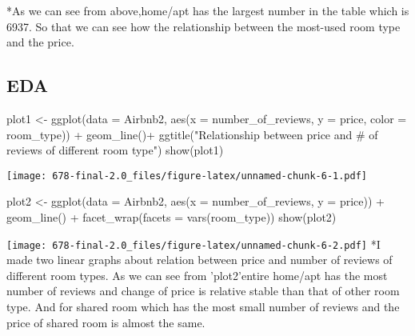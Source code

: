 \documentclass[
]{article}
\newenvironment{Shaded}{\begin{snugshade}}{\end{snugshade}}
\newcommand{\AttributeTok}[1]{\textcolor[rgb]{0.77,0.63,0.00}{#1}}
\newcommand{\FunctionTok}[1]{\textcolor[rgb]{0.00,0.00,0.00}{#1}}
\newcommand{\NormalTok}[1]{#1}
\newcommand{\OtherTok}[1]{\textcolor[rgb]{0.56,0.35,0.01}{#1}}
\newcommand{\SpecialCharTok}[1]{\textcolor[rgb]{0.00,0.00,0.00}{#1}}
\newcommand{\StringTok}[1]{\textcolor[rgb]{0.31,0.60,0.02}{#1}}
\begin{document}
*As we can see from above,home/apt has the largest number in the table
which is 6937. So that we can see how the relationship between the
most-used room type and the price.

\hypertarget{eda}{%
\subsection{EDA}\label{eda}}

\begin{Shaded}
\begin{Highlighting}[]
\NormalTok{plot1 }\OtherTok{\textless{}{-}} \FunctionTok{ggplot}\NormalTok{(}\AttributeTok{data =}\NormalTok{ Airbnb2, }\FunctionTok{aes}\NormalTok{(}\AttributeTok{x =}\NormalTok{ number\_of\_reviews, }\AttributeTok{y =}\NormalTok{ price, }\AttributeTok{color =}\NormalTok{ room\_type)) }\SpecialCharTok{+}
    \FunctionTok{geom\_line}\NormalTok{()}\SpecialCharTok{+}
  \FunctionTok{ggtitle}\NormalTok{(}\StringTok{"Relationship between price and \# of reviews of different room type"}\NormalTok{)}
\FunctionTok{show}\NormalTok{(plot1)}
\end{Highlighting}
\end{Shaded}

\texttt{[image: 678-final-2.0\_files/figure-latex/unnamed-chunk-6-1.pdf]}

\begin{Shaded}
\begin{Highlighting}[]
\NormalTok{plot2 }\OtherTok{\textless{}{-}} \FunctionTok{ggplot}\NormalTok{(}\AttributeTok{data =}\NormalTok{ Airbnb2, }\FunctionTok{aes}\NormalTok{(}\AttributeTok{x =}\NormalTok{ number\_of\_reviews, }\AttributeTok{y =}\NormalTok{ price)) }\SpecialCharTok{+}
    \FunctionTok{geom\_line}\NormalTok{() }\SpecialCharTok{+}
    \FunctionTok{facet\_wrap}\NormalTok{(}\AttributeTok{facets =} \FunctionTok{vars}\NormalTok{(room\_type))  }
\FunctionTok{show}\NormalTok{(plot2)}
\end{Highlighting}
\end{Shaded}

\texttt{[image: 678-final-2.0\_files/figure-latex/unnamed-chunk-6-2.pdf]}
*I made two linear graphs about relation between price and number of
reviews of different room types. As we can see from 'plot2'entire
home/apt has the most number of reviews and change of price is relative
stable than that of other room type. And for shared room which has the
most small number of reviews and the price of shared room is almost the
same.
\end{document}
